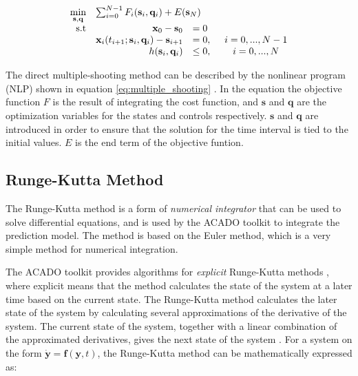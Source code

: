 \begin{equation}
\label{eq:multiple_shooting}
	\begin{array}{rrlcl}
	\displaystyle \min_{\mathbf{s},\mathbf{q}} & \multicolumn{3}{l}{\sum_{i=0}^{N-1} F_i(\mathbf{s}_i, \mathbf{q}_i)+ E(\mathbf{s}_N)} \\
	\textrm{s.t}
	& \mathbf{x}_0 - \mathbf{s}_0 & = 0 & \\
	& \mathbf{x}_i(t_{i+1};\mathbf{s}_i,\mathbf{q}_i)-\mathbf{s}_{i+1} & = 0,& \hspace{5pt} i = 0,...,N-1 \\
	& h(\mathbf{s}_i, \mathbf{q}_i) & \leq 0,& \hspace{5pt} i = 0,...,N
	\end{array}
\end{equation}

The direct multiple-shooting method can be described by the nonlinear program (NLP) shown in equation \ref{eq:multiple_shooting} \cite{stallMATHISEN}. In the equation the objective function $F$ is the result of integrating the cost function, and $\mathbf{s}$ and $\mathbf{q}$ are the optimization variables for the states and controls respectively. $\mathbf{s}$ and $\mathbf{q}$ are introduced in order to ensure that the solution for the time interval is tied to the initial values. $E$ is the end term of the objective funtion.


\subsection{Runge-Kutta Method}

The Runge-Kutta method is a form of \textit{numerical integrator} that can be used to solve differential equations, and is used by the ACADO toolkit to integrate the prediction model. The method is based on the Euler method, which is a very simple method for numerical integration.

The ACADO toolkit provides algorithms for \textit{explicit} Runge-Kutta methods \cite{acadoHOUSKA}, where explicit means that the method calculates the state of the system at a later time based on the current state. The Runge-Kutta method calculates the later state of the system by calculating several approximations of the derivative of the system. The current state of the system, together with a linear combination of the approximated derivatives, gives the next state of the system \cite{modsimEGELAND}. For a system on the form $\mathbf{\dot{y}} = \mathbf{f}(\mathbf{y},t)$, the Runge-Kutta method can be mathematically expressed as:

